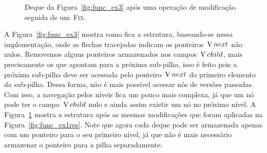 \documentclass[main.tex]{subfiles}
\begin{document}
\begin{figure}
\centering
{}
\caption{Deque da Figura~\ref{fig:func_ex3} após uma operação de modificação seguida de um~\textsc{Fix}.} \label{fig:func_ex3res}
\end{figure}

A Figura~\ref{fig:func_ex3} mostra como fica a estrutura, baseando-se nessa implementação, onde as flechas tracejadas indicam os ponteiros~$\operatorname{V}{next}$ não nulos. Removemos alguns ponteiros armazenados nos campos~$\operatorname{V}{child}$, mais precisamente os que apontam para a próxima sub-pilha, isso é feito pois a próxima sub-pilha deve ser acessada pelo ponteiro~$\operatorname{V}{next}$ do primeiro elemento da sub-pilha. Dessa forma, não é mais possível acessar nós de versões passadas. Com isso, a navegação pelos níveis fica um pouco mais complexa, já que um nó pode ter o campo~$\operatorname{V}{child}$ nulo e ainda assim existir um nó no próximo nível. A Figura~\ref{fig:func_ex3res} mostra a estrutura após as mesmas modificações que foram aplicadas na Figura~\ref{fig:func_ex1res}. Note que agora cada deque pode ser armazenada apenas com um ponteiro para o seu primeiro nível, já que não é mais necessário armazenar o ponteiro para a pilha separadamente.
\end{document}
